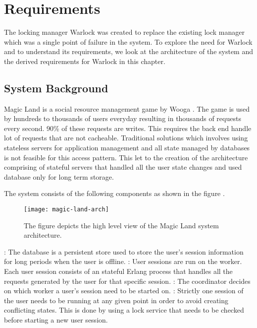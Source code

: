 \chapter{Requirements}
\label{chapter:requirements}

The locking manager Warlock was created to replace the existing lock manager
which was a single point of failure in the system. To explore the need for
Warlock and to understand its requirements, we look at the architecture of
the system and the derived requirements for Warlock in this chapter.

\section{System Background}

Magic Land \citep{magicland} is a social%
resource management game by Wooga%
. The game is used by hundreds to thousands of users everyday resulting in
thousands of  requests every second. 90\% of these requests are
writes. This requires the back end%
handle lot of requests that are not cacheable. Traditional solutions which
involves using stateless servers for application management and all state
managed
by databases is not feasible for this access pattern. This let to the creation
of the architecture comprising of stateful servers that handled all the user
state changes and used database only for long term storage.

The system consists of the following components as shown in the figure
.

\begin{figure}
  \texttt{[image: magic-land-arch]}
  \caption[Magic Land Architecture]{%
    The figure depicts the high level view of the Magic Land system
    architecture.}
    \label{figure:magic.land.architecture}
  \normalcaption
\end{figure}

\begin{itemize}
    : The database is a persistent store used to store the
    user's session information for long periods when the user is offline.
    : User sessions are run on the worker. Each user session
    consists of an stateful Erlang process that handles all the requests
    generated by the user for that specific session.
    : The coordinator decides on which worker a user's
    session need to be started on.
    : Strictly one session of the user needs to be
    running at any given point in order to avoid creating conflicting states.
    This is done by using a lock service that needs to be checked before
    starting a new user session.
\end{itemize}

